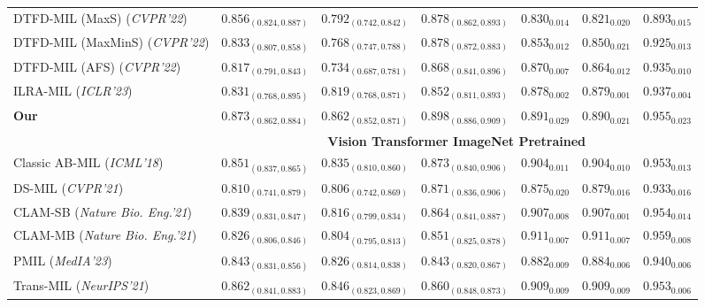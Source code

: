 \documentclass[runningheads]{llncs}
\begin{document}
\begin{table}[t]
{\begin{tabular}{lccc|ccc}
                    DTFD-MIL (MaxS) (\textit{CVPR'22})  &$0.856_{(0.824,0.887)} $& $0.792_{(0.742,0.842)}$& $0.878_{(0.862,0.893)} $&$ 0.830_{0.014 }$& $0.821_{0.020}$& $0.893_{0.015}$
                    \\ %
                    DTFD-MIL (MaxMinS) (\textit{CVPR'22})  &$0.833_{(0.807,0.858)}$ & $0.768_{(0.747,0.788)}$ & $0.878_{(0.872,0.883)}$ & $0.853_{0.012}$ & $0.850_{0.021}$ & $0.925_{0.013}$ \\ %
                    DTFD-MIL (AFS) (\textit{CVPR'22})  & $0.817_{(0.791,0.843)}$ & $0.734_{(0.687,0.781)}$ & $0.868_{(0.841,0.896)}$ & $0.870_{0.007}$ & $0.864_{0.012}$ & $0.935_{0.010}$
                    \\%
                    ILRA-MIL (\textit{ICLR'23})  &$0.831_{(0.768,0.895)}$& $0.819_{(0.768,0.871)}$ & $0.852_{(0.811,0.893)} $ & $0.878_{0.002}$ &$0.879_{0.001}$ &$0.937_{0.004}$  

\\                  
                     \rowcolor{blue!8}
                     \textbf{Our} 
&$\mathbf{0.873}_{(0.862, 0.884)}$& $\mathbf{0.862}_{(0.852, 0.871)}$ & $\mathbf{0.898}_{(0.886, 0.909)}$ & $\mathbf{0.891}_{0.029}$&$\mathbf{0.890}_{0.021}$&$\mathbf{0.955}_{0.023}$

\\ 
                    
                \hline
                 & \multicolumn{6}{c}{\cellcolor{blue!20}\bf Vision Transformer ImageNet Pretrained } \\
                     Classic AB-MIL (\textit{ICML'18})   & $0.851_{(0.837,0.865)}$& $0.835_{(0.810,0.860)}$ & $0.873_{(0.840,0.906)}$ &$0.904_{0.011}$ & $0.904_{0.010}$ & $0.953_{0.013}$\\ %
   
                    DS-MIL (\textit{CVPR'21})  &$0.810_{(0.741,0.879)}$  &$0.806_{(0.742,0.869)}$  &$0.871_{(0.836,0.906)}$  &$0.875_{0.020}$ & $0.879_{0.016}$ &$0.933_{0.016}$\\ %
                    CLAM-SB (\textit{Nature Bio. Eng.'21}) & $0.839_{(0.831,0.847)}$ & $0.816_{(0.799,0.834)}$ & $0.864_{(0.841,0.887)}$ & $0.907_{0.008}$ & $0.907_{0.001}$ & $0.954_{0.014}$\\ %
                    CLAM-MB (\textit{Nature Bio. Eng.'21}) &$0.826_{(0.806,0.846)}$ & $0.804_{(0.795,0.813)}$& $0.851_{(0.825,0.878)} $& $0.911_{0.007} $& $0.911_{0.007}$ & $0.959_{0.008}$\\ %
                    PMIL (\textit{MedIA'23})  &$0.843_{(0.831,0.856)}$& $0.826_{(0.814,0.838)}$ & $0.843_{(0.820,0.867)} $ 
                     & $0.882_{0.009}$ &$0.884_{0.006}$ &$0.940_{0.006}$
                     \\
                    Trans-MIL (\textit{NeurIPS'21}) & $0.862_{(0.841,0.883)}$  & $0.846_{(0.823,0.869)}$  & $0.860_{(0.848,0.873)}$ & $0.909_{0.009}$  & $0.909_{0.009}$  & $0.953_{0.006}$ \\ %
                    

\end{tabular}}
\end{table}
\end{document}
